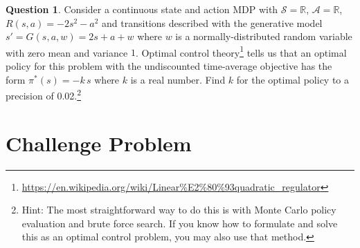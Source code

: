 \documentclass{article}
\theoremstyle{definition}
\newtheorem{question}[thm]{Question}
\newcommand{\reals}{\mathbb{R}}
\begin{document}
\begin{question}

    Consider a continuous state and action MDP with $\mathcal{S} = \reals$, $\mathcal{A} = \reals$, $R(s, a) = - 2s^2 - a^2$ and transitions described with the generative model $s' = G(s, a, w) = 2s + a + w$ where $w$ is a normally-distributed random variable with zero mean and variance $1$. Optimal control theory\footnote{\url{https://en.wikipedia.org/wiki/Linear\%E2\%80\%93quadratic_regulator}} tells us that an optimal policy for this problem with the undiscounted time-average objective has the form $\pi^*(s) = -k\,s$ where $k$ is a real number. Find $k$ for the optimal policy to a precision of 0.02.\footnote{Hint: The most straightforward way to do this is with Monte Carlo policy evaluation and brute force search. If you know how to formulate and solve this as an optimal control problem, you may also use that method.}
\end{question}

\section{Challenge Problem}
\end{document}

